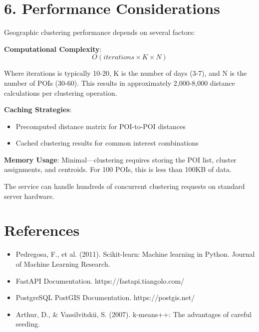 \section{6. Performance Considerations}

Geographic clustering performance depends on several factors:

\textbf{Computational Complexity}:
\begin{equation}
O(iterations \times K \times N)
\end{equation}

Where iterations is typically 10-20, K is the number of days (3-7), and N is the number of POIs (30-60). This results in approximately 2,000-8,000 distance calculations per clustering operation.

\textbf{Caching Strategies}:
\begin{itemize}
\item Precomputed distance matrix for POI-to-POI distances
\item Cached clustering results for common interest combinations
\end{itemize}

\textbf{Memory Usage}:
Minimal—clustering requires storing the POI list, cluster assignments, and centroids. For 100 POIs, this is less than 100KB of data.

The service can handle hundreds of concurrent clustering requests on standard server hardware.

\section*{References}

\begin{itemize}
\item Pedregosa, F., et al. (2011). Scikit-learn: Machine learning in Python. Journal of Machine Learning Research.
\item FastAPI Documentation. https://fastapi.tiangolo.com/
\item PostgreSQL PostGIS Documentation. https://postgis.net/
\item Arthur, D., \& Vassilvitskii, S. (2007). k-means++: The advantages of careful seeding.
\end{itemize}
